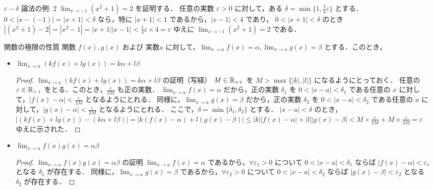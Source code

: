 \documentclass[a4paper]{ltjsarticle}
\begin{document}
  \begin{tcb}{$\varepsilon - \delta$ 論法の例: 2}{}
    $\displaystyle \lim_{x \to -1} (x^2 + 1) = 2$ を証明する．
    任意の実数 $\varepsilon >0 $ に対して，ある $\delta = \min\{1, \frac{1}{4}\varepsilon\}$ とする．
    $0 < |x - (-1)| = |x + 1| < \delta$ なら，特に $|x + 1| < 1$ であるから，$|x - 1| < 4$ であり，
    $0 < |x + 1| < \delta$ のとき $|(x^2 + 1) - 2| = |x^2 - 1| = |x + 1| |x - 1| < \frac{1}{4}\varepsilon \times 4 = \varepsilon$
    ゆえに $\displaystyle \lim_{x \to -1} (x^2 + 1) = 2$ である．
  \end{tcb}

  \begin{theorem}{関数の極限の性質}{}
    関数 $f(x), g(x)$ および 実数$a$ に対して，$\displaystyle \lim_{x \to a} f(x) = \alpha, \lim_{x \to a} g(x) = \beta$ とする．このとき，
    \begin{itemize}
      \item $\displaystyle \lim_{x \to a} (k f(x) + l g(x)) = k\alpha + l\beta$
      \begin{proof}{$\displaystyle \lim_{x \to a} (k f(x) + l g(x)) = k\alpha + l\beta$ の証明（写経）}{}
        $M \in \mathbb{R}_{++}$ を $M > \max\{|k|, |l|\}$ になるようにとっておく．
        任意の $\varepsilon \in \mathbb{R}_{++}$ をとる．このとき，$\frac{\varepsilon}{2M}$ も正の実数．
        $\lim_{x \to a} f(x) = \alpha$ だから，正の実数 $\delta_1$ を $0 < |x - a| < \delta_1$ である任意の $x$ に対して，$|f(x) - \alpha| < \frac{\varepsilon}{2M}$ となるようにとれる．
        同様に，$\lim_{x \to a} g(x) = \beta$ だから，正の実数 $\delta_2$ を $0 < |x - a| < \delta_2$ である任意の $x$ に対して，$|g(x) - \alpha| < \frac{\varepsilon}{2M}$ となるようにとれる．
        ここで，$\delta= \min\{\delta_1, \delta_2\}$ とする． $|x - a| < \delta$ のとき，$|(kf(x) + lg(x)) - (k\alpha + l \beta)| 
        = |k(f(x) - \alpha) + l(g(x) - \beta)| \leq |k||f(x) - \alpha| + |l| |g(x) - \beta| < M \times \frac{\varepsilon}{2M} + M \times \frac{\varepsilon}{2M} = \varepsilon$
        ゆえに示された．
      \end{proof}
      \item $\displaystyle \lim_{x \to a} f(x)g(x) = \alpha\beta$ 
      \begin{proof}{$\displaystyle \lim_{x \to a} f(x)g(x) = \alpha\beta$ の証明}{}
        $\lim_{x \to a} f(x) = \alpha$ であるから，$\forall\varepsilon_1 > 0$ について $0 < |x - a| < \delta_1$ ならば $|f(x) - \alpha| < \varepsilon_1$ となる $\delta_1$ が存在する．
        同様に，$\lim_{x \to a} g(x) = \beta$ であるから，$\forall\varepsilon_2 > 0$ について $0 < |x - a| < \delta_2$ ならば $|g(x) - \beta| < \varepsilon_2$ となる $\delta_2$ が存在する．

\end{proof}
\end{itemize}
\end{theorem}
\end{document}
